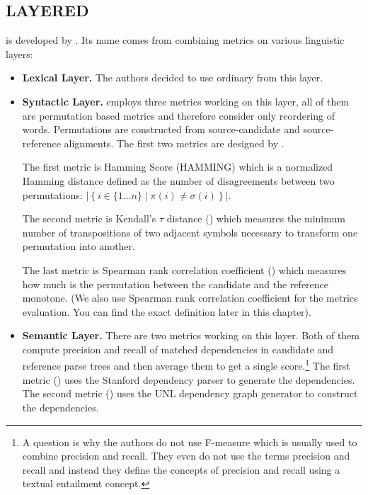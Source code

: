 \subsection{LAYERED}

 is developed by . Its name
comes from combining metrics on various linguistic layers:

\begin{itemize}

    \item \textbf{Lexical Layer.} The authors decided to use ordinary
         from this layer.

    \item \textbf{Syntactic Layer.}  employs three metrics
        working on this layer, 
        all of them are permutation based
        metrics and therefore consider only reordering of words. Permutations
        are constructed from source-candidate and source-reference alignments.
        The first two metrics are designed by .

        The first metric is Hamming Score (HAMMING) which is a normalized
        Hamming distance defined as the number of disagreements between two
        permutations: $\left| \left\{ i \in \{1 \ldots n\} \mid \pi(i) \ne
        \sigma(i) \right\} \right|$. 

        The second metric is Kendall's $\tau$ distance () which
        measures the minimum number of transpositions of two adjacent symbols
        necessary to transform one permutation into another.
        
        The last metric
        is Spearman rank correlation coefficient () which
        measures how much is the permutation between the candidate and the
        reference monotone. (We also use Spearman rank correlation coefficient
        for the metrics evaluation. You can find the exact definition later in
        this chapter).

    \item \textbf{Semantic Layer.} There are two metrics working on this layer.
        Both of them compute precision and recall of matched dependencies in
        candidate and reference parse trees and then average them to get a
        single score.\footnote{A question is why the authors do not use
            F-measure which is usually used to combine precision and recall.
        They even do not use the terms precision and recall and instead they
    define the concepts of precision and recall using a textual entailment
concept.}  The first metric () uses the Stanford dependency
parser  to generate the dependencies. The
second metric () uses the UNL dependency graph generator to
construct the dependencies.

\end{itemize}

